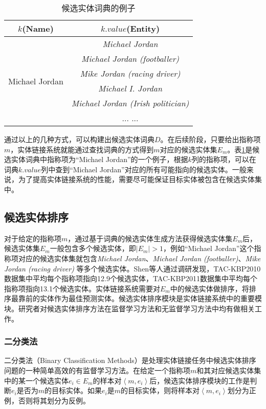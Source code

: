 \begin{table}[!htb]
	\caption{候选实体词典的例子\label{tab:candidate_dict_example}}
	\begin{center}
		\begin{tabular}{|c|c|}
			\hline
			$k$(Name) & $k.value$(Entity) \\ \hline
			\multirow{6}{*}{Michael Jordan} &  \textit{Michael Jordan}\\
			& \textit{Michael Jordan (footballer)} \\
			& \textit{Mike Jordan (racing driver) } \\
			& \textit{Michael I. Jordan} \\
			& \textit{Michael Jordan (Irish politician)} \\
			& ... ... \\
			\hline
		\end{tabular}
	\end{center}
\end{table}

通过以上的几种方式，可以构建出候选实体词典$D$。在后续阶段，只要给出指称项$m$，实体链接系统就能通过查找词典的方式得到$m$对应的候选实体集$E_m$。表\ref{tab:candidate_dict_example}是候选实体词典中指称项为“Michael Jordan”的一个例子，根据$k$列的指称项，可以在词典$k.value$列中查到“Michael Jordan”对应的所有可能指向的候选实体。一般来说，为了提高实体链接系统的性能，需要尽可能保证目标实体被包含在候选实体集中。

\subsection{候选实体排序}\label{section:candidate_rank}
对于给定的指称项$m$，通过基于词典的候选实体生成方法获得候选实体集$E_m$后，候选实体集$E_m$一般包含多个候选实体，即$|E_m|>1$，例如“Michael Jordan”这个指称项对应的候选实体集就包含\textit{Michael Jordan}、\textit{Michael Jordan (footballer)}、\textit{Mike Jordan (racing driver) }等多个候选实体。Shen等人\cite{ELKBITS}通过调研发现，TAC-KBP2010数据集中平均每个指称项指向12.9个候选实体，TAC-KBP2011数据集中平均每个指称项指向13.1个候选实体。实体链接系统需要对$E_m$中的候选实体做排序，将排序最靠前的实体作为最佳预测实体。候选实体排序模块是实体链接系统中的重要模块。研究者对候选实体排序方法在监督学习方法和无监督学习方法中均有做相关工作。

\setcounter{secnumdepth}{3}
\subsubsection{二分类法}
二分类法（Binary Classification Methods）是处理实体链接任务中候选实体排序问题的一种简单高效的有监督学习方法。在给定一个指称项$m$和其对应候选实体集中的某一个候选实体$e_i\in E_m$的样本对$\left\langle m,e_i\right\rangle $后，候选实体排序模块的工作是判断$e_i$是否为$m$的目标实体。如果$e_i$是$m$的目标实体，则将样本对$\left\langle m,e_i\right\rangle $划分为正例，否则将其划分为反例。

